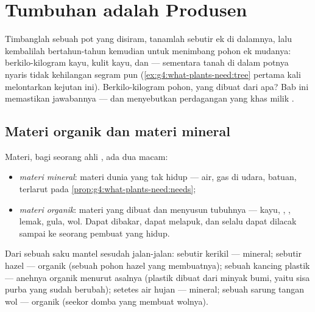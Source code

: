 \chapter{Tumbuhan adalah Produsen}\label{ch:g6:plants-are-producers}

Timbanglah sebuah pot yang disiram, tanamlah sebutir  ek di
dalamnya, lalu kembalilah bertahun-tahun kemudian untuk menimbang
pohon ek mudanya: berkilo-kilogram kayu, kulit kayu,  dan  ---
sementara tanah di dalam potnya nyaris tidak kehilangan segram pun
(\cref{ex:g4:what-plants-need:tree} pertama kali melontarkan kejutan
ini). Berkilo-kilogram pohon, yang dibuat dari apa? Bab ini
memastikan jawabannya --- dan menyebutkan perdagangan yang khas milik
.

\section{Materi organik dan materi mineral}

\begin{definition}\label{def:g6:plants-are-producers:matter}
Materi, bagi seorang ahli , ada dua macam:
\begin{itemize}
  \item \emph{materi mineral}: materi dunia yang
        tak hidup --- air, gas di udara, batuan, 
        terlarut pada
        \cref{prop:g4:what-plants-need:needs};
  \item \emph{materi organik}: materi yang
        dibuat  dan menyusun tubuhnya --- kayu, ,
        , lemak, gula, wol. Dapat dibakar, dapat melapuk, dan
        selalu dapat dilacak sampai ke seorang pembuat yang hidup.
\end{itemize}
\end{definition}

\begin{example}\label{ex:g6:plants-are-producers:sorting}
Dari sebuah saku mantel sesudah jalan-jalan: sebutir kerikil ---
mineral; sebutir  hazel --- organik (sebuah pohon hazel yang
membuatnya); sebuah kancing plastik --- anehnya organik menurut
asalnya (plastik dibuat dari minyak bumi, yaitu sisa 
purba yang sudah berubah); setetes air hujan --- mineral; sebuah sarung
tangan wol --- organik (seekor domba yang membuat wolnya).
\end{example}

